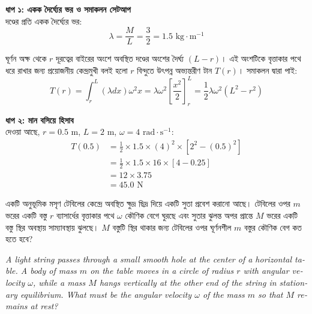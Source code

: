 \documentclass[12pt, a4paper]{article}
\begin{document}
\begin{tcolorbox}[solutionbox={সমাধান (Solution)}]
    \noindent
    \textbf{ধাপ ১: একক দৈর্ঘ্যের ভর ও সমাকলন সেটআপ} \\
    দণ্ডের প্রতি একক দৈর্ঘ্যের ভর:
    \[ \lambda = \frac{M}{L} = \frac{3}{2} = 1.5\text{ kg}\cdot\text{m}^{-1} \]
    
    ঘূর্ণন অক্ষ থেকে $r$ দূরত্বের বাইরের অংশে অবস্থিত দণ্ডের অংশের দৈর্ঘ্য $(L - r)$। এই অংশটিকে বৃত্তাকার পথে ধরে রাখার জন্য প্রয়োজনীয় কেন্দ্রমুখী বলই হলো $r$ বিন্দুতে উৎপন্ন অভ্যন্তরীণ টান $T(r)$। সমাকলন দ্বারা পাই:
    \[ T(r) = \int_r^L (\lambda dx) \omega^2 x = \lambda \omega^2 \left[ \frac{x^2}{2} \right]_r^L = \frac{1}{2} \lambda \omega^2 (L^2 - r^2) \]
    
    \vspace{0.5em}
    \noindent\textbf{ধাপ ২: মান বসিয়ে হিসাব} \\
    দেওয়া আছে, $r = 0.5\text{ m}$, $L = 2\text{ m}$, $\omega = 4\text{ rad}\cdot\text{s}^{-1}$:
    \begin{align*}
        T(0.5) &= \frac{1}{2} \times 1.5 \times (4)^2 \times [2^2 - (0.5)^2] \\
               &= \frac{1}{2} \times 1.5 \times 16 \times [4 - 0.25] \\
               &= 12 \times 3.75 \\
               &= \mathbf{45.0}\text{ N}
    \end{align*}
\end{tcolorbox}
\newpage

\begin{tcolorbox}[questionbox={প্রশ্ন (Question) 32}]
    \noindent
    একটি অনুভূমিক মসৃণ টেবিলের কেন্দ্রে অবস্থিত ক্ষুদ্র ছিদ্র দিয়ে একটি সুতা প্রবেশ করানো আছে। টেবিলের ওপর $m$ ভরের একটি বস্তু $r$ ব্যাসার্ধের বৃত্তাকার পথে $\omega$ কৌণিক বেগে ঘুরছে এবং সুতার ঝুলন্ত অপর প্রান্তে $M$ ভরের একটি বস্তু স্থির অবস্থায় সাম্যাবস্থায় ঝুলছে। $M$ বস্তুটি স্থির থাকার জন্য টেবিলের ওপর ঘূর্ণনশীল $m$ বস্তুর কৌণিক বেগ কত হতে হবে?
    
    \vspace{0.8em}
    \begin{english}
    \noindent\textit{\color{darkgray}
    A light string passes through a small smooth hole at the center of a horizontal table. A body of mass $m$ on the table moves in a circle of radius $r$ with angular velocity $\omega$, while a mass $M$ hangs vertically at the other end of the string in stationary equilibrium. What must be the angular velocity $\omega$ of the mass $m$ so that $M$ remains at rest?
    }
    \end{english}
\end{tcolorbox}
\end{document}

